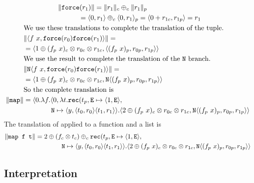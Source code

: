 \begin{align*}
  &\qquad\quad\quad\quad \|\texttt{force}(r_1)\| = \|r_1\|_c \oplus_c \|r_1\|_p \\
  &\qquad\quad\quad\quad\quad\quad\quad = \langle 0, r_1 \rangle \oplus_c \langle 0, r_1 \rangle_p = \langle 0 + r_{1c}, r_{1p} \rangle = r_1  \\
  &\text{We use these translations to complete the translation of the tuple.} \\
  &\|\langle f\ x, \texttt{force}(r_0) \texttt{force}(r_1)\rangle \| = \\
  &= \langle 1 \oplus (f_p\ x)_c \otimes r_{0c} \otimes r_{1c}, \langle (f_p\ x)_p, r_{0p}, r_{1p}\rangle\rangle \\
  &\text{We use the result to complete the translation of the \texttt{N} branch.}\\
  &\|\texttt{N}\langle f\ x, \texttt{force}(r_0) \texttt{force}(r_1)\rangle \| = \\
  &= \langle 1 \oplus (f_p\ x)_c \otimes r_{0c} \otimes r_{1c}, \texttt{N} \langle (f_p\ x)_p, r_{0p}, r_{1p}\rangle\rangle \\
  &\text{So the complete translation is}\\
  \|\texttt{map}\| &= \langle 0.\lambda f.\langle 0,\lambda t.\texttt{rec}(t_p, \texttt{E} \mapsto \langle 1, \texttt{E}\rangle, \\
  &\qquad\quad\quad \texttt{N} \mapsto \langle y, \langle t_0, r_0 \rangle \langle t_1, r_1 \rangle \rangle.  \langle 2 \oplus (f_p\ x)_c \otimes r_{0c} \otimes r_{1c}, \texttt{N} \langle (f_p\ x)_p, r_{0p}, r_{1p}\rangle\rangle
\end{align*}
%
The translation of  applied to a function  and a list  is
%
\begin{align*}
  \|\texttt{map f t}\| &= 2 \oplus (f_c \otimes t_c) \oplus_c \texttt{rec}(t_p, \texttt{E} \mapsto \langle 1, \texttt{E}\rangle, \\
    &\qquad\quad\quad \texttt{N} \mapsto \langle y, \langle t_0, r_0 \rangle \langle t_1, r_1 \rangle \rangle.  \langle 2 \oplus (f_p\ x)_c \otimes r_{0c} \otimes r_{1c}, \texttt{N} \langle (f_p\ x)_p, r_{0p}, r_{1p}\rangle\rangle
\end{align*}
%

\subsection{Interpretation}
